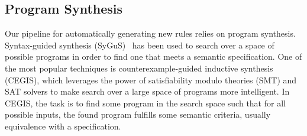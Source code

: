 \documentclass[sigplan,10pt,review,anonymous]{acmart}\settopmatter{printfolios=true,printccs=false,printacmref=false}
\begin{document}





\subsection{Program Synthesis}
Our pipeline for automatically generating new rules relies on program synthesis.
Syntax-guided synthesis (SyGuS)~\cite{sygus} has been used
to search over a space of possible programs in order to find one that meets
a semantic specification.  One of the most popular techniques is counterexample-guided
inductive synthesis (CEGIS), which leverages the power of satisfiability modulo theories
(SMT) and SAT solvers to make search over a large space of programs more intelligent.
In CEGIS, the task is to find some program in the search space such that for all possible
inputs, the found program fulfills some semantic criteria, usually equivalence with
a specification.
\end{document}
